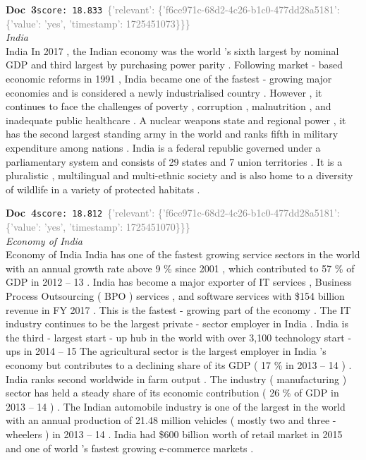 \documentclass[a4paper,11pt]{article}
\begin{document}
\begin{docenv}
{\footnotesize\textcolor{doccolor}{\textbf{Doc~3}}}\hfill{\tiny\texttt{score:~18.833}}\ {\tiny\textcolor{gray}{\{'relevant': \{'f6ce971c-68d2-4c26-b1c0-477dd28a5181': \{'value': 'yes', 'timestamp': 1725451073\}\}\}}}\\[3pt]
{\small\textit{India}}\\[2pt]
\vspace{2pt}
{\footnotesize India
In 2017 , the Indian economy was the world 's sixth largest by nominal GDP and third largest by purchasing power parity . Following market - based economic reforms in 1991 , India became one of the fastest - growing major economies and is considered a newly industrialised country . However , it continues to face the challenges of poverty , corruption , malnutrition , and inadequate public healthcare . A nuclear weapons state and regional power , it has the second largest standing army in the world and ranks fifth in military expenditure among nations . India is a federal republic governed under a parliamentary system and consists of 29 states and 7 union territories . It is a pluralistic , multilingual and multi-ethnic society and is also home to a diversity of wildlife in a variety of protected habitats .}
\end{docenv}
\begin{docenv}
{\footnotesize\textcolor{doccolor}{\textbf{Doc~4}}}\hfill{\tiny\texttt{score:~18.812}}\ {\tiny\textcolor{gray}{\{'relevant': \{'f6ce971c-68d2-4c26-b1c0-477dd28a5181': \{'value': 'yes', 'timestamp': 1725451070\}\}\}}}\\[3pt]
{\small\textit{Economy of India}}\\[2pt]
\vspace{2pt}
{\footnotesize Economy of India
India has one of the fastest growing service sectors in the world with an annual growth rate above 9 \% since 2001 , which contributed to 57 \% of GDP in 2012 -- 13 . India has become a major exporter of IT services , Business Process Outsourcing ( BPO ) services , and software services with \$154 billion revenue in FY 2017 . This is the fastest - growing part of the economy . The IT industry continues to be the largest private - sector employer in India . India is the third - largest start - up hub in the world with over 3,100 technology start - ups in 2014 -- 15 The agricultural sector is the largest employer in India 's economy but contributes to a declining share of its GDP ( 17 \% in 2013 -- 14 ) . India ranks second worldwide in farm output . The industry ( manufacturing ) sector has held a steady share of its economic contribution ( 26 \% of GDP in 2013 -- 14 ) . The Indian automobile industry is one of the largest in the world with an annual production of 21.48 million vehicles ( mostly two and three - wheelers ) in 2013 -- 14 . India had \$600 billion worth of retail market in 2015 and one of world 's fastest growing e-commerce markets .}
\end{docenv}
\end{document}
